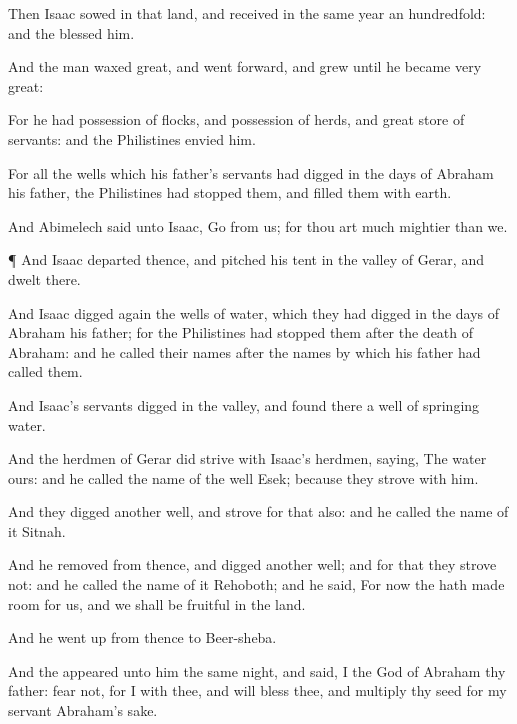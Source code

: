 {\par }{\PP {}Then
Isaac
sowed in that
land, and
received in the same
year an
hundredfold: and the
{}
blessed him.

And the
man waxed
great, and
went
forward, and
grew until he
became
very
great:

For he had
possession of
flocks, and
possession of
herds, and great
store of
servants: and the
Philistines
envied him.

For all the
wells which his
father’s
servants had
digged in the
days of
Abraham his
father, the
Philistines had
stopped them, and
filled them with
earth.

And
Abimelech
said unto
Isaac,
Go from us; for thou art
much
mightier than we.


\par }{\PP {}¶ And
Isaac
departed thence, and pitched his
tent in the
valley of
Gerar, and
dwelt
there.

And
Isaac
digged
again the
wells of
water, which they had
digged in the
days of
Abraham his
father; for the
Philistines had
stopped them
after the
death of
Abraham: and he
called their
names after the
names by
which his
father had
called them.

And
Isaac’s
servants
digged in the
valley, and
found there a
well of
springing
water.

And the
herdmen of
Gerar did
strive with
Isaac’s
herdmen,
saying, The
water
{} ours: and he
called the
name of the
well
Esek; because they
strove with him.

And they
digged
another
well, and
strove for that also: and he
called the name of
it
Sitnah.

And he
removed from thence, and
digged
another
well; and for that they
strove not: and he
called the name of
it
Rehoboth; and he
said, For
now the
{} hath made
room for us, and we shall be
fruitful in the
land.

And he went
up from thence to
Beer-sheba.

And the
{}
appeared unto him the same
night, and
said, I
{} the
God of
Abraham thy
father:
fear not, for I
{}
with thee, and will
bless thee, and
multiply thy
seed for my
servant
Abraham’s sake.

}
